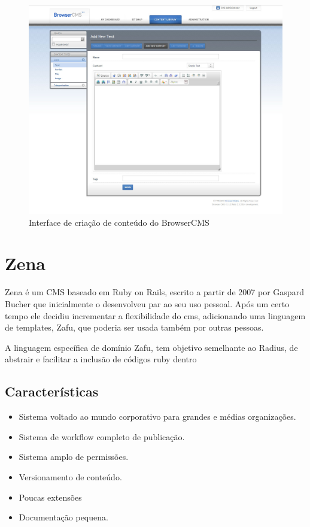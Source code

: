 \begin{figure}[here]
\includegraphics[width=150mm]{images/browser_cms_new_content.jpg}
\caption{Interface de criação de conteúdo do BrowserCMS}
\label{fig:browsercms_new_content.png}
\end{figure}


\section{Zena}

Zena é um CMS baseado em Ruby on Rails, escrito a partir de 2007 por Gaspard Bucher que inicialmente o desenvolveu par ao seu uso pessoal. Após um certo tempo ele decidiu incrementar a flexibilidade do cms, adicionando uma linguagem de templates, Zafu, que poderia ser usada também por outras pessoas.

A linguagem específica de domínio Zafu, tem objetivo semelhante ao Radius, de abstrair e facilitar a inclusão de códigos ruby dentro 


\subsection{Características}

\begin{itemize}
  \item Sistema voltado ao mundo corporativo para grandes e médias organizações.
  \item Sistema de workflow completo de publicação.
  \item Sistema amplo de permissões.
  \item Versionamento de conteúdo.
  \item Poucas extensões 
  \item Documentação pequena.
\end{itemize}

